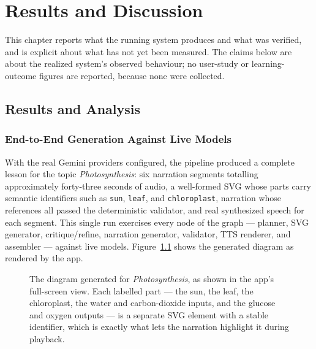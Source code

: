 \chapter{Results and Discussion}
\label{ch:results}

This chapter reports what the running system produces and what was verified,
and is explicit about what has not yet been measured. The claims below are
about the realized system's observed behaviour; no user-study or
learning-outcome figures are reported, because none were collected.

\section{Results and Analysis}
\label{sec:results}

\subsection{End-to-End Generation Against Live Models}

With the real Gemini providers configured, the pipeline produced a complete
lesson for the topic \emph{Photosynthesis}: six narration segments totalling
approximately forty-three seconds of audio, a well-formed SVG whose parts
carry semantic identifiers such as \texttt{sun}, \texttt{leaf}, and
\texttt{chloroplast}, narration whose references all passed the
deterministic validator, and real synthesized speech for each segment. This
single run exercises every node of the graph --- planner, SVG generator,
critique/refine, narration generator, validator, TTS renderer, and assembler
--- against live models. Figure~\ref{fig:diagram} shows the generated
diagram as rendered by the app.

\begin{figure}[htbp]
\centering
{}
\caption{The diagram generated for \emph{Photosynthesis}, as shown in the
app's full-screen view. Each labelled part --- the sun, the leaf, the
chloroplast, the water and carbon-dioxide inputs, and the glucose and oxygen
outputs --- is a separate SVG element with a stable identifier, which is
exactly what lets the narration highlight it during playback.}
\label{fig:diagram}
\end{figure}

